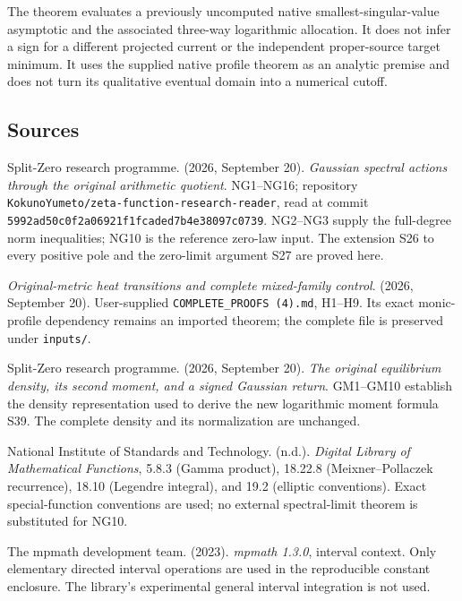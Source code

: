 \documentclass[11pt]{article}
\begin{document}
The theorem evaluates a previously uncomputed native smallest-singular-value asymptotic and the associated three-way logarithmic allocation. It does not infer a sign for a different projected current or the independent proper-source target minimum. It uses the supplied native profile theorem as an analytic premise and does not turn its qualitative eventual domain into a numerical cutoff.

\subsection{Sources}\label{sources}

Split-Zero research programme. (2026, September 20). \emph{Gaussian spectral actions through the original arithmetic quotient}. NG1--NG16; repository \nolinkurl{KokunoYumeto/zeta-function-research-reader}, read at commit \nolinkurl{5992ad50c0f2a06921f1fcaded7b4e38097c0739}. NG2--NG3 supply the full-degree norm inequalities; NG10 is the reference zero-law input. The extension S26 to every positive pole and the zero-limit argument S27 are proved here.

\emph{Original-metric heat transitions and complete mixed-family control}. (2026, September 20). User-supplied \nolinkurl{COMPLETE_PROOFS (4).md}, H1--H9. Its exact monic-profile dependency remains an imported theorem; the complete file is preserved under \texttt{inputs/}.

Split-Zero research programme. (2026, September 20). \emph{The original equilibrium density, its second moment, and a signed Gaussian return}. GM1--GM10 establish the density representation used to derive the new logarithmic moment formula S39. The complete density and its normalization are unchanged.

National Institute of Standards and Technology. (n.d.). \emph{Digital Library of Mathematical Functions}, 5.8.3 (Gamma product), 18.22.8 (Meixner--Pollaczek recurrence), 18.10 (Legendre integral), and 19.2 (elliptic conventions). Exact special-function conventions are used; no external spectral-limit theorem is substituted for NG10.

The mpmath development team. (2023). \emph{mpmath 1.3.0}, interval context. Only elementary directed interval operations are used in the reproducible constant enclosure. The library's experimental general interval integration is not used.
\end{document}
